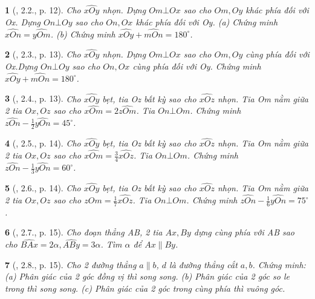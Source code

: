 \documentclass{article}
\newtheorem{baitoan}{}
\begin{document}
\begin{baitoan}[\cite{Hung_Mai_Toan_7_hinh_hoc}, 2.2., p. 12]
	Cho $\widehat{xOy}$ nhọn. Dựng $Om\bot Ox$ sao cho $Om,Oy$ khác phía đối với Ox. Dựng $On\bot Oy$ sao cho $On,Ox$ khác phía đối với Oy. (a) Chứng minh $\widehat{xOn} = \widehat{yOm}$. (b) Chứng minh $\widehat{xOy} + \widehat{mOn} = 180^\circ$.
\end{baitoan}

\begin{baitoan}[\cite{Hung_Mai_Toan_7_hinh_hoc}, 2.3., p. 13]
	Cho $\widehat{xOy}$ nhọn. Dựng $Om\bot Ox$ sao cho $Om,Oy$ cùng phía đối với Ox.Dựng $On\bot Oy$ sao cho $On,Ox$ cùng phía đối với Oy. Chứng minh $\widehat{xOy} + \widehat{mOn} = 180^\circ$.
\end{baitoan}

\begin{baitoan}[\cite{Hung_Mai_Toan_7_hinh_hoc}, 2.4., p. 13]
	Cho $\widehat{xOy}$ bẹt, tia Oz bất kỳ sao cho $\widehat{xOz}$ nhọn. Tia Om nằm giữa 2 tia $Ox,Oz$ sao cho $\widehat{xOm} = 2\widehat{zOm}$. Tia $On\bot Om$. Chứng minh $\widehat{zOn} - \frac{1}{2}\widehat{yOn} = 45^\circ$.
\end{baitoan}

\begin{baitoan}[\cite{Hung_Mai_Toan_7_hinh_hoc}, 2.5., p. 14]
	Cho $\widehat{xOy}$ bẹt, tia Oz bất kỳ sao cho $\widehat{xOz}$ nhọn. Tia Om nằm giữa 2 tia $Ox,Oz$ sao cho $\widehat{xOm} = \frac{3}{4}\widehat{xOz}$. Tia $On\bot Om$. Chứng minh $\widehat{zOn} - \frac{1}{3}\widehat{yOn} = 60^\circ$.
\end{baitoan}

\begin{baitoan}[\cite{Hung_Mai_Toan_7_hinh_hoc}, 2.6., p. 14]
	Cho $\widehat{xOy}$ bẹt, tia Oz bất kỳ sao cho $\widehat{xOz}$ nhọn. Tia Om nằm giữa 2 tia $Ox,Oz$ sao cho $\widehat{zOm} = \frac{1}{7}\widehat{xOz}$. Tia $On\bot Om$. Chứng minh $\widehat{zOn} - \frac{1}{6}\widehat{yOn} = 75^\circ$.
\end{baitoan}

\begin{baitoan}[\cite{Hung_Mai_Toan_7_hinh_hoc}, 2.7., p. 15]
	Cho đoạn thẳng AB, 2 tia $Ax,By$ dựng cùng phía với AB sao cho $\widehat{BAx} = 2\alpha,\widehat{ABy} = 3\alpha$. Tìm $\alpha$ để $Ax\parallel By$.
\end{baitoan}

\begin{baitoan}[\cite{Hung_Mai_Toan_7_hinh_hoc}, 2.8., p. 15]
	Cho 2 đường thẳng $a\parallel b$, $d$ là đường thẳng cắt $a,b$. Chứng minh: (a) Phân giác của 2 góc đồng vị thì song song. (b) Phân giác của 2 góc so le trong thì song song. (c) Phân giác của 2 góc trong cùng phía thì vuông góc.
\end{baitoan}
\end{document}
